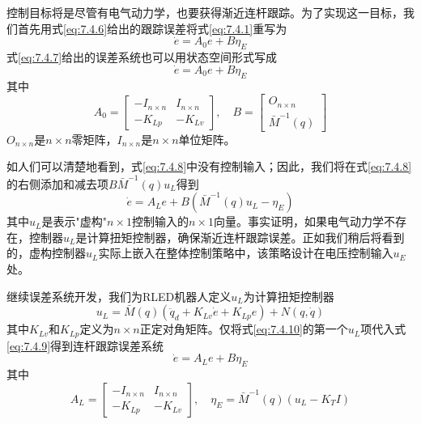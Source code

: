 \documentclass[UTF8]{ctexart}
\begin{document}
控制目标将是尽管有电气动力学，也要获得渐近连杆跟踪。为了实现这一目标，我们首先用式\eqref{eq:7.4.6}给出的跟踪误差将式\eqref{eq:7.4.1}重写为
\begin{equation}\label{eq:7.4.7}
\dot{e} = A_0 e + B\eta_E
\end{equation}
式\eqref{eq:7.4.7}给出的误差系统也可以用状态空间形式写成
\begin{equation}\label{eq:7.4.8}
\dot{e} = A_0 e + B\eta_E
\end{equation}
其中
\begin{equation*}
A_0 = \begin{bmatrix} -I_{n \times n} & I_{n \times n} \\ -K_{Lp} & -K_{Lv} \end{bmatrix}, \quad B = \begin{bmatrix} O_{n \times n} \\ \bar{M}^{-1}(q) \end{bmatrix}
\end{equation*}
$O_{n \times n}$是$n \times n$零矩阵，$I_{n \times n}$是$n \times n$单位矩阵。

如人们可以清楚地看到，式\eqref{eq:7.4.8}中没有控制输入；因此，我们将在式\eqref{eq:7.4.8}的右侧添加和减去项$B\bar{M}^{-1}(q)u_L$得到
\begin{equation}\label{eq:7.4.9}
\dot{e} = A_L e + B(\bar{M}^{-1}(q)u_L - \eta_E)
\end{equation}
其中$u_L$是表示"虚构"$n \times 1$控制输入的$n \times 1$向量。事实证明，如果电气动力学不存在，控制器$u_L$是计算扭矩控制器，确保渐近连杆跟踪误差。正如我们稍后将看到的，虚构控制器$u_L$实际上嵌入在整体控制策略中，该策略设计在电压控制输入$u_E$处。

继续误差系统开发，我们为RLED机器人定义$u_L$为计算扭矩控制器
\begin{equation}\label{eq:7.4.10}
u_L = \bar{M}(q)(\ddot{q}_d + K_{Lv}\dot{e} + K_{Lp}e) + N(q,\dot{q})
\end{equation}
其中$K_{Lv}$和$K_{Lp}$定义为$n \times n$正定对角矩阵。仅将式\eqref{eq:7.4.10}的第一个$u_L$项代入式\eqref{eq:7.4.9}得到连杆跟踪误差系统
\begin{equation}\label{eq:7.4.11}
\dot{e} = A_L e + B\eta_E
\end{equation}
其中
\begin{equation}\label{eq:7.4.12}
A_L = \begin{bmatrix} -I_{n \times n} & I_{n \times n} \\ -K_{Lp} & -K_{Lv} \end{bmatrix}, \quad \eta_E = \bar{M}^{-1}(q)(u_L - K_T I)
\end{equation}
\end{document}
